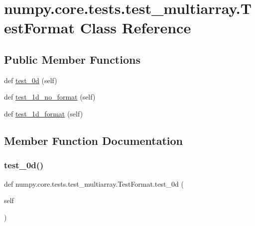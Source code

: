\hypertarget{classnumpy_1_1core_1_1tests_1_1test__multiarray_1_1TestFormat}{}\section{numpy.\+core.\+tests.\+test\+\_\+multiarray.\+Test\+Format Class Reference}
\label{classnumpy_1_1core_1_1tests_1_1test__multiarray_1_1TestFormat}
\subsection*{Public Member Functions}
\begin{DoxyCompactItemize}
\item 
def \hyperlink{classnumpy_1_1core_1_1tests_1_1test__multiarray_1_1TestFormat_a54c090c2bcda45c2cf8504ef644a1f32}{test\+\_\+0d} (self)
\item 
def \hyperlink{classnumpy_1_1core_1_1tests_1_1test__multiarray_1_1TestFormat_aeefb9038733370133cdebf9b4aafa188}{test\+\_\+1d\+\_\+no\+\_\+format} (self)
\item 
def \hyperlink{classnumpy_1_1core_1_1tests_1_1test__multiarray_1_1TestFormat_ae3070a300e5d73cde426b7941c9d8c5d}{test\+\_\+1d\+\_\+format} (self)
\end{DoxyCompactItemize}


\subsection{Member Function Documentation}
\mbox{\label{classnumpy_1_1core_1_1tests_1_1test__multiarray_1_1TestFormat_a54c090c2bcda45c2cf8504ef644a1f32}} 
\subsubsection{\texorpdfstring{test\+\_\+0d()}{test\_0d()}}
{\footnotesize\ttfamily def numpy.\+core.\+tests.\+test\+\_\+multiarray.\+Test\+Format.\+test\+\_\+0d (\begin{DoxyParamCaption}\item[{}]{self }\end{DoxyParamCaption})}

